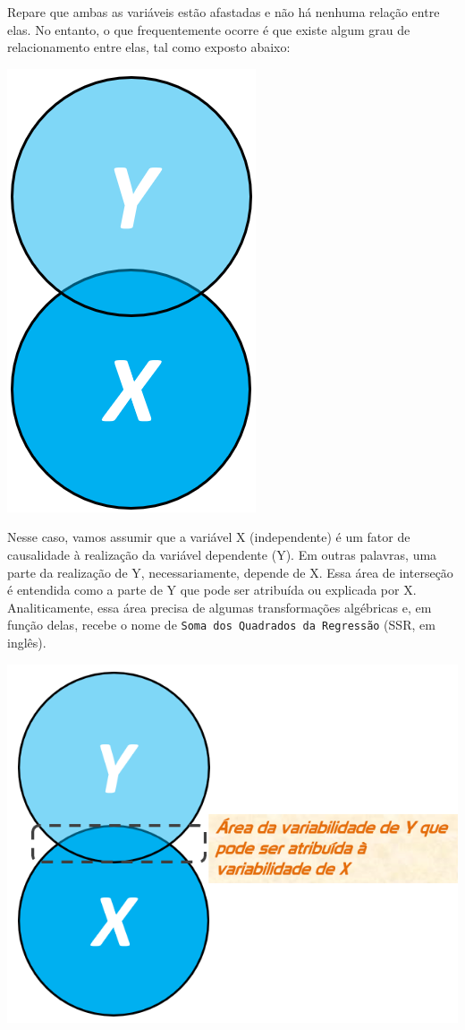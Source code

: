 \documentclass[
]{book}
\begin{document}
Repare que ambas as variáveis estão afastadas e não há nenhuma relação entre elas. No entanto, o que frequentemente ocorre é que existe algum grau de relacionamento entre elas, tal como exposto abaixo:

\includegraphics{./img/cap_reg_x_y2.png}

Nesse caso, vamos assumir que a variável X (independente) é um fator de causalidade à realização da variável dependente (Y). Em outras palavras, uma parte da realização de Y, necessariamente, depende de X. Essa área de interseção é entendida como a parte de Y que pode ser atribuída ou explicada por X. Analiticamente, essa área precisa de algumas transformações algébricas e, em função delas, recebe o nome de \texttt{Soma\ dos\ Quadrados\ da\ Regressão} (SSR, em inglês).

\includegraphics{./img/cap_reg_x_y_SSR.png}
\end{document}
